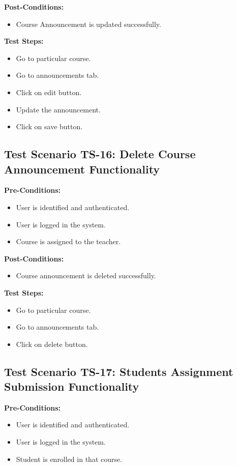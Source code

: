 \textbf{Post-Conditions: }
\begin{itemize}

\item Course Announcement is updated successfully.

\end{itemize}
\textbf{Test Steps:}
\begin{itemize}

\item Go to particular course.
\item Go to announcements tab.
\item Click on edit button.
\item Update the announcement.
\item Click on save button.

\end{itemize}


\subsection{Test Scenario TS-16: Delete Course Announcement Functionality}
\textbf{Pre-Conditions: }
\begin{itemize}

\item User is identified and authenticated.
\item User is logged in the system.
\item Course is assigned to the teacher.

\end{itemize}

\textbf{Post-Conditions: }
\begin{itemize}

\item Course announcement is deleted successfully.

\end{itemize}
\textbf{Test Steps:}
\begin{itemize}

\item Go to particular course.
\item Go to announcements tab.
\item Click on delete button.

\end{itemize}



\subsection{Test Scenario TS-17: Students Assignment Submission Functionality}
\textbf{Pre-Conditions: }
\begin{itemize}

\item User is identified and authenticated.
\item User is logged in the system.
\item Student is enrolled in that course.

\end{itemize}

